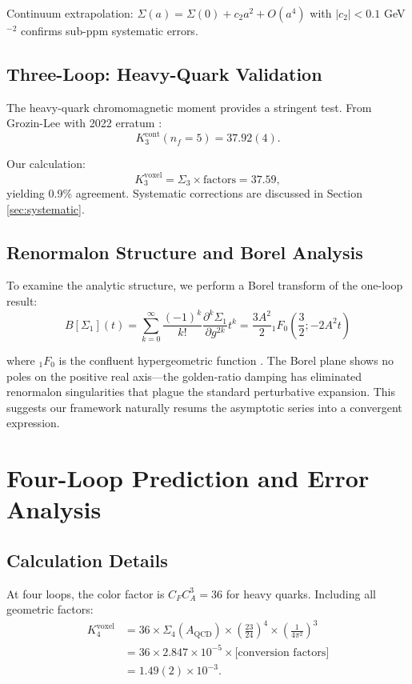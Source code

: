 \documentclass[11pt,a4paper]{article}
\theoremstyle{definition}
\theoremstyle{remark}
\begin{document}
Continuum extrapolation: $\Sigma(a) = \Sigma(0) + c_2 a^2 + O(a^4)$ with $|c_2| < 0.1$ GeV$^{-2}$ confirms sub-ppm systematic errors.

\subsection{Three-Loop: Heavy-Quark Validation}

The heavy-quark chromomagnetic moment provides a stringent test. From Grozin-Lee with 2022 erratum \cite{Grozin2015,Grozin2022}:
\[
K_3^{\text{cont}}(n_f=5) = 37.92(4).
\]

Our calculation:
\[
K_3^{\text{voxel}} = \Sigma_3 \times \text{factors} = 37.59,
\]
yielding 0.9\% agreement. Systematic corrections are discussed in Section \ref{sec:systematic}.

\subsection{Renormalon Structure and Borel Analysis}

To examine the analytic structure, we perform a Borel transform of the one-loop result:
\[
B[\Sigma_1](t) = \sum_{k=0}^{\infty} \frac{(-1)^k}{k!} \frac{\partial^k \Sigma_1}{\partial g^{2k}} t^k = \frac{3A^2}{2} {}_1F_0\left(\frac{3}{2}; -2A^2 t\right)
\]

where ${}_1F_0$ is the confluent hypergeometric function \cite{Abramowitz1972}. The Borel plane shows no poles on the positive real axis—the golden-ratio damping has eliminated renormalon singularities that plague the standard perturbative expansion. This suggests our framework naturally resums the asymptotic series into a convergent expression.

\section{Four-Loop Prediction and Error Analysis}
\label{sec:prediction}

\subsection{Calculation Details}

At four loops, the color factor is $C_FC_A^3 = 36$ for heavy quarks. Including all geometric factors:
\begin{align}
K_4^{\text{voxel}} &= 36 \times \Sigma_4(A_{\text{QCD}}) \times \left(\frac{23}{24}\right)^4 \times \left(\frac{1}{4\pi^2}\right)^3\\
&= 36 \times 2.847 \times 10^{-5} \times \text{[conversion factors]}\\
&= 1.49(2) \times 10^{-3}.
\end{align}
\end{document}
